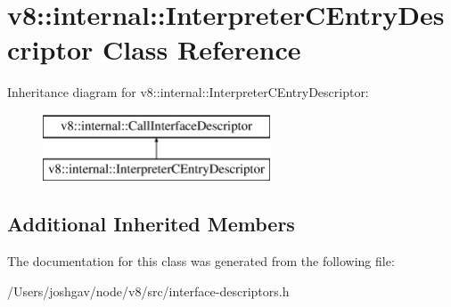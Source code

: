 \hypertarget{classv8_1_1internal_1_1_interpreter_c_entry_descriptor}{}\section{v8\+:\+:internal\+:\+:Interpreter\+C\+Entry\+Descriptor Class Reference}
\label{classv8_1_1internal_1_1_interpreter_c_entry_descriptor}
Inheritance diagram for v8\+:\+:internal\+:\+:Interpreter\+C\+Entry\+Descriptor\+:\begin{figure}[H]
\begin{center}
\leavevmode
\includegraphics[height=2.000000cm]{classv8_1_1internal_1_1_interpreter_c_entry_descriptor}
\end{center}
\end{figure}
\subsection*{Additional Inherited Members}


The documentation for this class was generated from the following file\+:\begin{DoxyCompactItemize}
\item 
/\+Users/joshgav/node/v8/src/interface-\/descriptors.\+h\end{DoxyCompactItemize}

